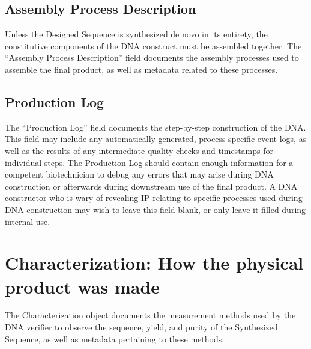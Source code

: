 \documentclass[12pt,letterpaper,english]{article}
\begin{document}
\subsection{Assembly Process Description}
Unless the Designed Sequence is synthesized de novo in its entirety, the constitutive components of the DNA construct must be assembled together. The “Assembly Process Description” field documents the assembly processes used to assemble the final product, as well as metadata related to these processes. \par

\subsection{Production Log}
The “Production Log” field documents the step-by-step construction of the DNA. This field may include any automatically generated, process specific event logs, as well as the results of any intermediate quality checks and timestamps for individual steps. The Production Log should contain enough information for a competent biotechnician to debug any errors that may arise during DNA construction or afterwards during downstream use of the final product. A DNA constructor who is wary of revealing IP relating to specific processes used during DNA construction may wish to leave this field blank, or only leave it filled during internal use. \par

\section{Characterization: How the physical product was made}

\begin{comment}
    I feel like Characterization and Synthesized Sequence are redundant in many fields. I understand Characterization to only describe the processes used to measure DNA, not the results. I similarly understand Synthesized Sequence to mean the physical object resulting from synthesis and assembly, as well as the description of the results of any measurements made on this physical object. As currently written, this division is not made clear.
\end{comment}

The Characterization object documents the measurement methods used by the DNA verifier to observe the sequence, yield, and purity of the Synthesized Sequence, as well as metadata pertaining to these methods. \par
\end{document}
